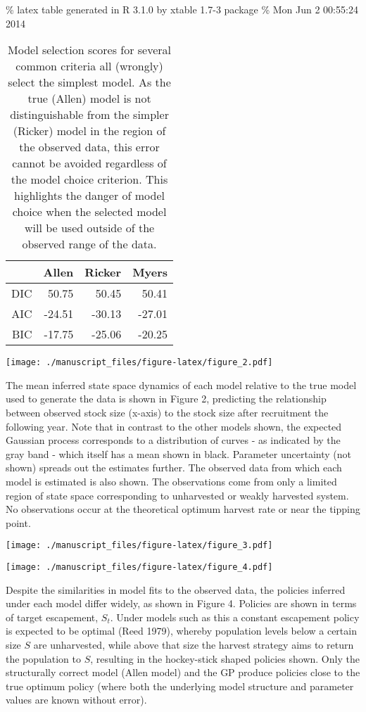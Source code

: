 \documentclass[]{components/elsarticle}
\begin{document}
\% latex table generated in R 3.1.0 by xtable 1.7-3 package \% Mon Jun 2
00:55:24 2014

\begin{table}[ht]
\centering
\begin{tabular}{rrrr}
  \hline
 & Allen & Ricker & Myers \\ 
  \hline
DIC & 50.75 & 50.45 & 50.41 \\ 
  AIC & -24.51 & -30.13 & -27.01 \\ 
  BIC & -17.75 & -25.06 & -20.25 \\ 
   \hline
\end{tabular}
\caption{Model selection scores for several common criteria all (wrongly) select the simplest model. As the true (Allen) model is not distinguishable from the simpler (Ricker) model in the region of the observed data, this error cannot be avoided regardless of the model choice criterion. This highlights the danger of model choice when the selected model will be used outside of the observed range of the data.} 
\end{table}

\texttt{[image: ./manuscript\_files/figure-latex/figure\_2.pdf]}

The mean inferred state space dynamics of each model relative to the
true model used to generate the data is shown in Figure 2, predicting
the relationship between observed stock size (x-axis) to the stock size
after recruitment the following year. Note that in contrast to the other
models shown, the expected Gaussian process corresponds to a
distribution of curves - as indicated by the gray band - which itself
has a mean shown in black. Parameter uncertainty (not shown) spreads out
the estimates further. The observed data from which each model is
estimated is also shown. The observations come from only a limited
region of state space corresponding to unharvested or weakly harvested
system. No observations occur at the theoretical optimum harvest rate or
near the tipping point.

\texttt{[image: ./manuscript\_files/figure-latex/figure\_3.pdf]}

\texttt{[image: ./manuscript\_files/figure-latex/figure\_4.pdf]}

Despite the similarities in model fits to the observed data, the
policies inferred under each model differ widely, as shown in Figure 4.
Policies are shown in terms of target escapement, $S_t$. Under models
such as this a constant escapement policy is expected to be optimal
(Reed 1979), whereby population levels below a certain size $S$ are
unharvested, while above that size the harvest strategy aims to return
the population to $S$, resulting in the hockey-stick shaped policies
shown. Only the structurally correct model (Allen model) and the GP
produce policies close to the true optimum policy (where both the
underlying model structure and parameter values are known without
error).
\end{document}
